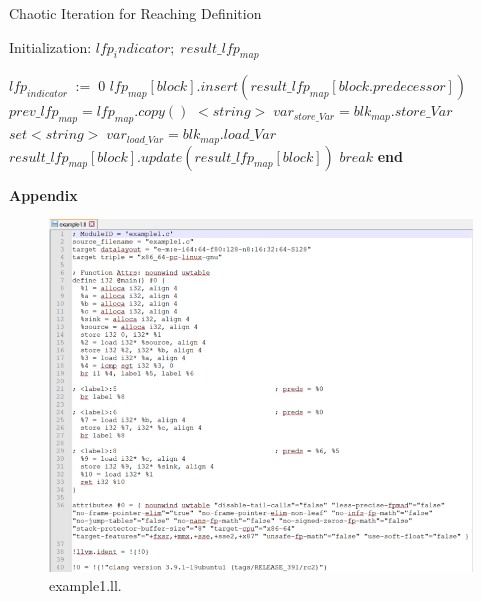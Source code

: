 \documentclass[english,12pt]{article}
\begin{document}
	\begin{algorithm}[H]
		\caption{Chaotic Iteration for Reaching Definition}
		\SetAlgoLined
		Initialization: $lfp_indicator; \;result\_lfp_{map}$
		
		\begin{algorithmic}
			
		\STATE $lfp_{indicator}\;:= \;0$
		\STATE $lfp_{map}[block].insert(result\_lfp_{map}[block.predecessor])$
		\STATE $prev\_lfp_{map} = lfp_{map}.copy()$
			\STATE $<string>\;var_{store\_Var} = blk_{map}.store\_Var$
			\STATE $set<string>\;var_{load\_Var} = blk_{map}.load\_Var$
			\STATE $result\_lfp_{map}[block].update(result\_lfp_{map}[block])$
			\ENDIF
		\ENDFOR
		\STATE $break$
		\ENDIF
		\ENDFOR
		\ENDWHILE
		\STATE \textbf{end}
		\end{algorithmic}
	\end{algorithm}
	
	\newpage
	
	
	
	\newpage
	{\huge \centering \bf Appendix \par}
	
	\appendix
	
	\begin{figure}
		\centering
		\includegraphics[width=1\textwidth]{example1_ll}
		\par
		\caption{example1.ll. \label{fig:example1_ll}}
	\end{figure}
	
\end{document}
